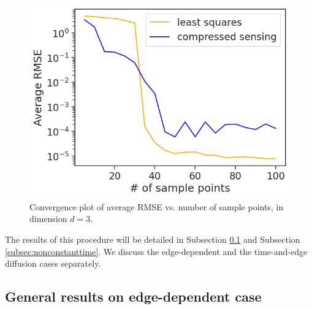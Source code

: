 \documentclass[12pt, oneside]{report}   	%
\begin{document}
\begin{figure}[t]
    \centering
    \includegraphics[scale=0.5]{g1_conv_NC.png}
    \caption{Convergence plot of average RMSE vs. number of sample points, in dimension $d=3$.}
    \label{fig:conv_ex1}
\end{figure}

\noindent The results of this procedure will be detailed in Subsection \ref{subsec:nonconstant} and Subsection \ref{subsec:nonconstanttime}. We discuss the edge-dependent and the time-and-edge diffusion cases separately.

\subsection{General results on edge-dependent case}
\label{subsec:nonconstant}
\end{document}
